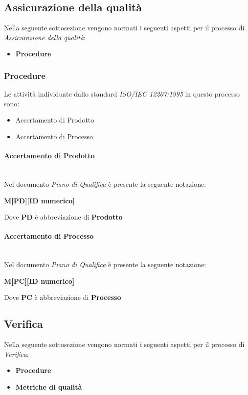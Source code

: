 \subsection{Assicurazione della qualità}
Nella seguente sottosezione vengono normati i seguenti aspetti per il 
processo di \textit{Assicurazione della qualità}:
\begin{itemize}
    \item \textbf{Procedure}
\end{itemize}

\subsubsection{Procedure}
Le attività individuate dallo standard \textit{ISO/IEC 12207:1995} in questo processo sono:
\begin{itemize}
    \item Accertamento di Prodotto
    \item Accertamento di Processo
\end{itemize}

\paragraph{Accertamento di Prodotto}
\mbox{}\\
Nel documento \textit{Piano di Qualifica} è presente la seguente notazione:
\begin{center}
    \textbf{M[PD][ID numerico]}
\end{center}
Dove \textbf{PD} è abbreviazione di \textbf{Prodotto}

\paragraph{Accertamento di Processo}
\mbox{}\\
Nel documento \textit{Piano di Qualifica} è presente la seguente notazione:
\begin{center}
    \textbf{M[PC][ID numerico]}
\end{center}
Dove \textbf{PC} è abbreviazione di \textbf{Processo}


\subsection{Verifica}
\label{sec:Verifica}
Nella seguente sottosezione vengono normati i seguenti aspetti per il 
processo di \textit{Verifica}:
\begin{itemize}
    \item \textbf{Procedure}
    \item \textbf{Metriche di qualità}
\end{itemize}

